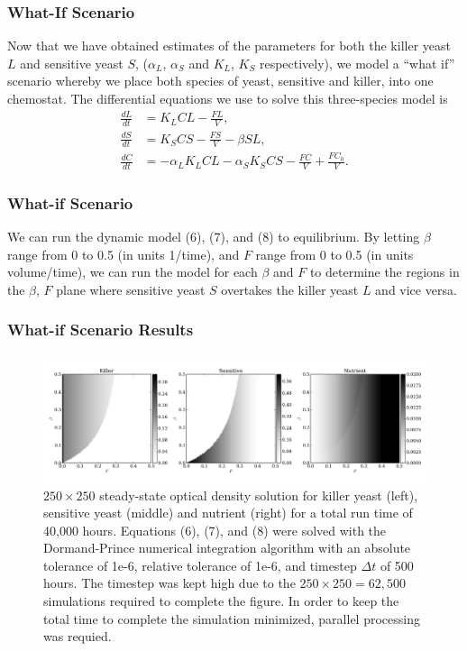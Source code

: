 \documentclass{beamer}
\begin{document}
\begin{frame}
  \frametitle{What-If Scenario}
  Now that we have obtained estimates of the parameters for both the killer yeast $L$ and sensitive yeast $S$, ($\alpha_L$, $\alpha_S$ and $K_L$, $K_S$ respectively), we model a ``what if'' scenario whereby we place both species of yeast, sensitive and killer, into one chemostat.  The differential equations we use to solve this three-species model is
  \begin{align}
    \frac{dL}{dt} &= K_L CL - \frac{FL}{V}, \\
    \frac{dS}{dt} &= K_S CS - \frac{FS}{V} - \beta S L, \\
    \frac{dC}{dt} &= -\alpha_L K_L CL -\alpha_S K_S CS - \frac{FC}{V} + \frac{FC_0}{V}.
  \end{align}
\end{frame}

\begin{frame}
  \frametitle{What-if Scenario}
  We can run the dynamic model (6), (7), and (8) to equilibrium.  By letting $\beta$ range from 0 to 0.5 (in units 1/time), and $F$ range from 0 to 0.5 (in units volume/time), we can run the model for each $\beta$ and $F$ to determine the regions in the $\beta$, $F$ plane where sensitive yeast $S$ overtakes the killer yeast $L$ and vice versa.
\end{frame}

\begin{frame}
  \frametitle{What-if Scenario Results}
  \begin{figure}[H]
    \centering
      \includegraphics[width=1.0\textwidth]{../doc/images/sols.png}
    \caption{\footnotesize $250 \times 250$ steady-state optical density solution for killer yeast (left), sensitive yeast (middle) and nutrient (right) for a total run time of 40,000 hours.  Equations (6), (7), and (8) were solved with the Dormand-Prince numerical integration algorithm with an absolute tolerance of 1e-6, relative tolerance of 1e-6, and timestep $\Delta t$ of 500 hours.  The timestep was kept high due to the $250 \times 250 = 62,500$ simulations required to complete the figure.  In order to keep the total time to complete the simulation minimized, parallel processing was requied.}
  \end{figure}  
\end{frame}
\end{document}
